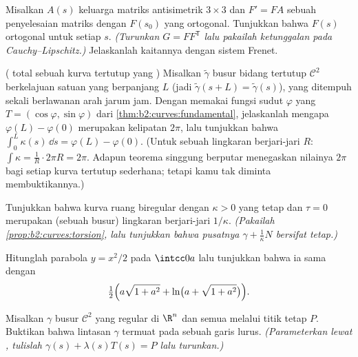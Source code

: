 \begin{exercise}[$\star\star\star$]\label{exo:b2:curves:7}
Misalkan $A(s)$ keluarga  matriks antisimetrik $3 \times 3$
dan $F' = F A$ sebuah penyelesaian matriks dengan $F(s_0)$
yang ortogonal. Tunjukkan bahwa $F(s)$ ortogonal untuk setiap $s$.
\emph{(Turunkan $G = F F^{\mathsf T}$ lalu pakailah ketunggalan pada
Cauchy--Lipschitz.)} Jelaskanlah kaitannya dengan sistem Frenet.
\end{exercise}

\begin{exercise}[$\star\star\star$]\label{exo:b2:curves:8}
( total sebuah kurva tertutup yang ) Misalkan $\tilde\gamma$
busur bidang tertutup $\mathcal{C}^2$ berkelajuan satuan yang berpanjang $L$
(jadi $\tilde\gamma(s + L) = \tilde\gamma(s)$), yang ditempuh sekali
berlawanan arah jarum jam. Dengan memakai fungsi sudut $\varphi$ yang $T =
(\cos\varphi, \sin\varphi)$ dari
\cref{thm:b2:curves:fundamental}, jelaskanlah mengapa $\varphi(L) -
\varphi(0)$ merupakan kelipatan $2\pi$, lalu tunjukkan bahwa
$\int_0^L \kappa(s)\,\dd s = \varphi(L) - \varphi(0)$. (Untuk sebuah
lingkaran berjari-jari $R$: $\int \kappa = \frac1R \cdot 2\pi R = 2\pi$.
Adapun teorema singgung berputar menegaskan nilainya $2\pi$ bagi
setiap kurva tertutup sederhana; tetapi kamu tak diminta membuktikannya.)
\end{exercise}

\begin{exercise}[$\star\star\star$]\label{exo:b2:curves:9}
Tunjukkan bahwa kurva ruang biregular dengan $\kappa > 0$ yang tetap dan
$\tau = 0$ merupakan (sebuah busur) lingkaran berjari-jari $1/\kappa$.
\emph{(Pakailah \cref{prop:b2:curves:torsion}, lalu tunjukkan bahwa pusatnya
$\gamma + \frac1\kappa N$ bersifat tetap.)}
\end{exercise}

\begin{exercise}[$\star$]\label{exo:b2:curves:10}
Hitunglah  parabola $y = x^2/2$ pada
$\intcc0a$ lalu tunjukkan bahwa ia sama dengan
\[
\tfrac12\Bigl(a\sqrt{1 + a^2} + \ln\bigl(a + \sqrt{1 +
a^2}\bigr)\Bigr).
\]
\end{exercise}

\begin{exercise}[$\star\star$]\label{exo:b2:curves:11}
Misalkan $\gamma$ busur $\mathcal C^2$ yang regular di $\R^n$ dan semua
 melalui titik tetap $P$. Buktikan bahwa
lintasan $\gamma$ termuat pada sebuah garis lurus.
\emph{(Parameterkan lewat , tulislah $\gamma(s) +
\lambda(s)T(s) = P$ lalu turunkan.)}
\end{exercise}


